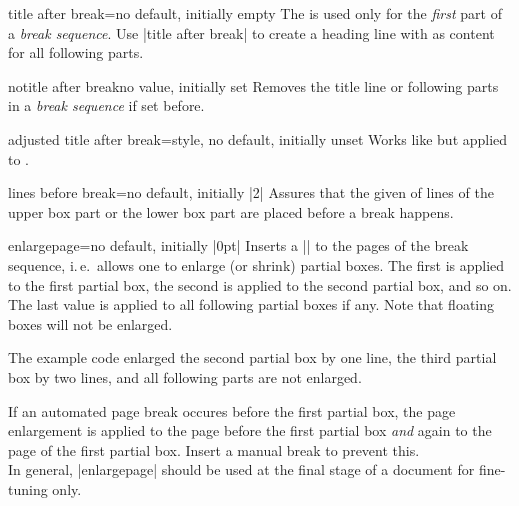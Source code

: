 \begin{docTcbKey}{title after break}{=}{no default, initially empty}
  The  is used only for the \emph{first} part of a
  \emph{break sequence}. Use |title after break| to create a heading line
  with  as content for all following parts.
\end{docTcbKey}


\begin{docTcbKey}{notitle after break}{}{no value, initially set}
  Removes the title line or following parts in a  \emph{break sequence} if set before.
\end{docTcbKey}


\begin{docTcbKey}{adjusted title after break}{=}{style, no default, initially unset}
  Works like  but applied to .
\end{docTcbKey}


\begin{docTcbKey}{lines before break}{=}{no default, initially |2|}
  Assures that the given  of lines of the upper box part or
  the lower box part are placed before a break happens.
\end{docTcbKey}

\clearpage
\begin{docTcbKey}{enlargepage}{=}{no default, initially |0pt|}
  Inserts a |\enlargethispage| to the pages of the break sequence,
  i.\,e.\ allows one to enlarge (or shrink) partial boxes. The first  is applied
  to the first partial box, the second  is applied
  to the second partial box, and so on. The last  value is applied
  to all following partial boxes if any. Note that floating boxes will not be enlarged.
\begin{dispListing}
\begin{tcolorbox}[breakable,enlargepage=0mm/\baselineskip/2\baselineskip/0mm,...
\end{dispListing}
  The example code enlarged the second partial box by one line, the third
  partial box by two lines, and all following parts are not enlarged.
  \begin{marker}
  If an automated page break occures before the first partial box, the
  page enlargement is applied to the page before the first partial box \emph{and}
  again to the page of the first partial box. Insert a manual break to prevent this.\\
  In general, |enlargepage| should be used at the final stage of a document
  for fine-tuning only.
  \end{marker}
\end{docTcbKey}


